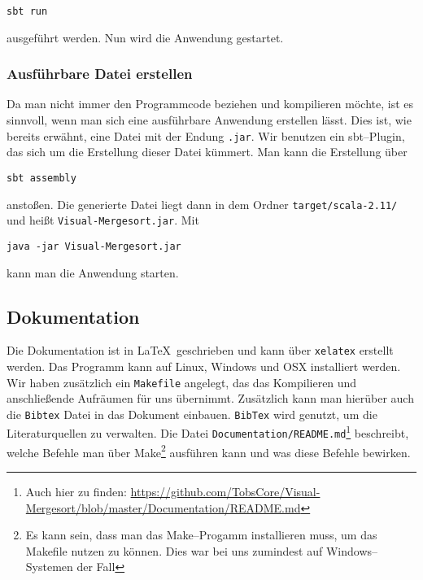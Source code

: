 \begin{verbatim}
sbt run
\end{verbatim}

ausgeführt werden. Nun wird die Anwendung gestartet.

\subsubsection{Ausführbare Datei erstellen}
Da man nicht immer den Programmcode beziehen und kompilieren möchte, ist es sinnvoll, wenn man sich eine ausführbare Anwendung erstellen lässt. Dies ist, wie bereits erwähnt, eine Datei mit der Endung \texttt{.jar}. Wir benutzen ein sbt--Plugin, das sich um die Erstellung dieser Datei kümmert. Man kann die Erstellung über

\begin{verbatim}
sbt assembly
\end{verbatim}

anstoßen. Die generierte Datei liegt dann in dem Ordner \texttt{target/scala-2.11/} und heißt \texttt{Visual-Mergesort.jar}. Mit

\begin{verbatim}
java -jar Visual-Mergesort.jar
\end{verbatim}

kann man die Anwendung starten.

\subsection{Dokumentation}\label{sec:latex}

Die Dokumentation ist in \LaTeX ~geschrieben und kann über \texttt{xelatex} erstellt werden. Das Programm kann auf Linux, Windows und OSX installiert werden. Wir haben zusätzlich ein \texttt{Makefile} angelegt, das das Kompilieren und anschließende Aufräumen für uns übernimmt. Zusätzlich kann man hierüber auch die \texttt{Bibtex} Datei in das Dokument einbauen. \texttt{BibTex} wird genutzt, um die Literaturquellen zu verwalten. Die Datei \texttt{Documentation/README.md}\footnote{Auch hier zu finden: \url{https://github.com/TobsCore/Visual-Mergesort/blob/master/Documentation/README.md}} beschreibt, welche Befehle man über Make\footnote{Es kann sein, dass man das Make--Progamm installieren muss, um das Makefile nutzen zu können. Dies war bei uns zumindest auf Windows--Systemen der Fall} ausführen kann und was diese Befehle bewirken.

